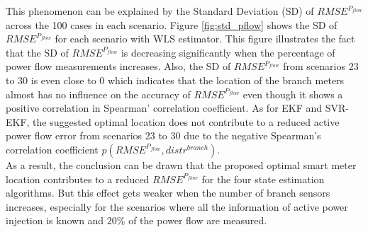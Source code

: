 This phenomenon can be explained by the Standard Deviation (SD) of $RMSE^{P_{flow}}$ across the 100 cases in each scenario. Figure \ref{fig:std_pflow} shows the SD of $RMSE^{P_{flow}}$ for each scenario with WLS estimator. This figure illustrates the fact that the SD of $RMSE^{P_{flow}}$ is decreasing significantly when the percentage of power flow measurements increases. Also, the SD of $RMSE^{P_{flow}}$ from scenarios 23 to 30 is even close to 0 which indicates that the location of the branch meters almost has no influence on the accuracy of $RMSE^{P_{flow}}$ even though it shows a positive correlation in Spearman' correlation coefficient. As for EKF and SVR-EKF, the suggested optimal location does not contribute to a reduced active power flow error from scenarios 23 to 30 due to the negative Spearman's correlation coefficient $p(RMSE^{P_{flow}},distr^{branch})$.  
\bigskip
\\As a result, the conclusion can be drawn that the proposed optimal smart meter location contributes to a reduced $RMSE^{P_{flow}}$ for the four state estimation algorithms. But this effect gets weaker when the number of branch sensors increases, especially for the scenarios where all the information of active power injection is known and $20 \%$ of the power flow are measured.

